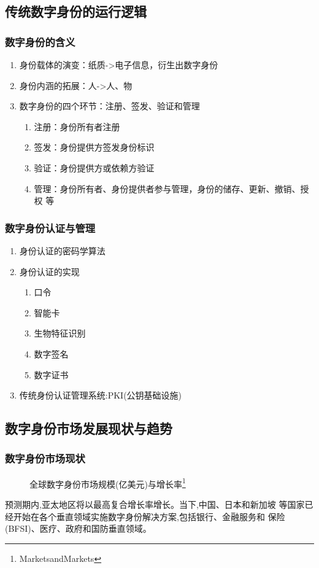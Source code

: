\documentclass[11pt]{beamer}
\begin{document}
\subsection{传统数字身份的运行逻辑}
\begin{frame}
	\frametitle{数字身份的含义}
	\begin{enumerate}
		\item 
		身份载体的演变：纸质->电子信息，衍生出数字身份
		\item  身份内涵的拓展：人->人、物
		\item 数字身份的四个环节：注册、签发、验证和管理
		\begin{enumerate}
			\item 注册：身份所有者注册
			\item 签发：身份提供方签发身份标识
			\item 验证：身份提供方或依赖方验证
			\item 管理：身份所有者、身份提供者参与管理，身份的储存、更新、撤销、授权
			等
		\end{enumerate}
	\end{enumerate}
\end{frame}

\begin{frame}
	\frametitle{数字身份认证与管理}
	\begin{enumerate}
		\item 身份认证的密码学算法
		\item 身份认证的实现
		\begin{enumerate}
			\item 口令
			\item 智能卡
			\item 生物特征识别
			\item 数字签名
			\item 数字证书
		\end{enumerate}
		\item 传统身份认证管理系统:PKI(公钥基础设施)
	\end{enumerate}
	\end{frame}

\subsection{数字身份市场发展现状与趋势}
\begin{frame}
	\frametitle{数字身份市场现状}
	\begin{figure}
\caption{全球数字身份市场规模(亿美元)与增长率\footnote{MarketsandMarkets}}
\end{figure}
	预测期内,亚太地区将以最高复合增长率增长。当下,中国、日本和新加坡
	等国家已经开始在各个垂直领域实施数字身份解决方案,包括银行、金融服务和
	保险(BFSI)、医疗、政府和国防垂直领域。
\end{frame}
\end{document}
